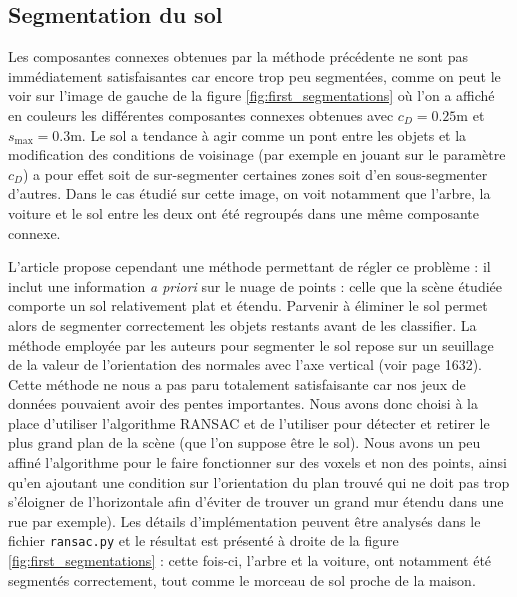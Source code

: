 \documentclass[a4paper, onecolumn, 11pt]{article}
\begin{document}
\subsection{Segmentation du sol}
Les composantes connexes obtenues par la méthode précédente ne sont pas immédiatement satisfaisantes car encore trop peu segmentées, comme on peut le voir sur l'image de gauche de la figure \ref{fig:first_segmentations} où l'on a affiché en couleurs les différentes composantes connexes obtenues avec $c_D = 0.25\text{m}$ et $s_\text{max}=0.3\text{m}$. Le sol a tendance à agir comme un pont entre les objets et la modification des conditions de voisinage (par exemple en jouant sur le paramètre $c_D$) a pour effet soit de sur-segmenter certaines zones soit d'en sous-segmenter d'autres. Dans le cas étudié sur cette image, on voit notamment que l'arbre, la voiture et le sol entre les deux ont été regroupés dans une même composante connexe. 

L'article propose cependant une méthode permettant de régler ce problème : il inclut une information \emph{a priori} sur le nuage de points : celle que la scène étudiée comporte un sol relativement plat et étendu. Parvenir à éliminer le sol permet alors de segmenter correctement les objets restants avant de les classifier.
La méthode employée par les auteurs pour segmenter le sol repose sur un seuillage de la valeur de l'orientation des normales avec l'axe vertical (voir page 1632). Cette méthode ne nous a pas paru totalement satisfaisante car nos jeux de données pouvaient avoir des pentes importantes. Nous avons donc choisi à la place d'utiliser l'algorithme RANSAC \cite{ransac} et de l'utiliser pour détecter et retirer le plus grand plan de la scène (que l'on suppose être le sol). Nous avons un peu affiné l'algorithme pour le faire fonctionner sur des voxels et non des points, ainsi qu'en ajoutant une condition sur l'orientation du plan trouvé qui ne doit pas trop s'éloigner de l'horizontale afin d'éviter de trouver un grand mur étendu dans une rue par exemple). Les détails d'implémentation peuvent être analysés dans le fichier \texttt{ransac.py} et le résultat est présenté à droite de la figure \ref{fig:first_segmentations} : cette fois-ci, l'arbre et la voiture, ont notamment été segmentés correctement, tout comme le morceau de sol proche de la maison.
\end{document}
